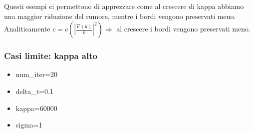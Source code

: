 Questi esempi ci permettono di apprezzare come al crescere di kappa abbiamo una maggior riduzione del rumore, mentre i bordi vengono preservati meno.\\
Analiticamente $c=c(|\frac{\nabla(u)}{k}|^2)\Longrightarrow$ al crescere i bordi vengono preservati meno.\\

\newpage
\subsubsection{Casi limite: kappa alto}
\begin{itemize}
    \item num\_iter=20
    \item delta\_t=0.1
    \item kappa=60000
    \item sigma=1
\end{itemize}

